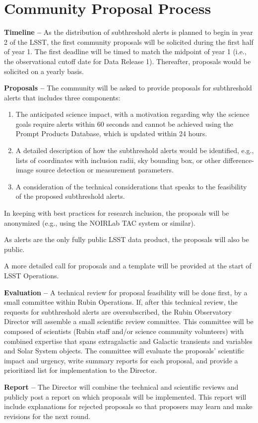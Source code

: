 \section{Community Proposal Process}\label{sec:process}

\textbf{Timeline --}
As the distribution of subthreshold alerts is planned to begin in year 2 of the LSST, the first community proposals will be solicited during the first half of year 1.
The first deadline will be timed to match the midpoint of year 1 (i.e., the observational cutoff date for Data Release 1).
Thereafter, proposals would be solicited on a yearly basis.

\textbf{Proposals --}
The community will be asked to provide proposals for subthreshold alerts that includes three components:

\begin{enumerate}
\item The anticipated science impact, with a motivation regarding why the science goals require alerts within 60 seconds and cannot be achieved using the Prompt Products Database, which is updated within 24 hours.
\item A detailed description of how the subthreshold alerts would be identified, e.g., lists of coordinates with inclusion radii, sky bounding box, or other difference-image source detection or measurement parameters.
\item A consideration of the technical considerations that speaks to the feasibility of the proposed subthreshold alerts.
\end{enumerate}

In keeping with best practices for research inclusion, the proposals will be anonymized (e.g., using the NOIRLab TAC system or similar).

As alerts are the only fully public LSST data product, the proposals will also be public.

A more detailed call for proposals and a template will be provided at the start of LSST Operations.

\textbf{Evaluation --} A technical review for proposal feasibility will be done first, by a small committee within Rubin Operations.
If, after this technical review, the requests for subthreshold alerts are oversubscribed, the Rubin Observatory Director will assemble a small scientific review committee.
This committee will be composed of scientists (Rubin staff and/or science community volunteers) with combined expertise that spans extragalactic and Galactic transients and variables and Solar System objects.
The committee will evaluate the proposals' scientific impact and urgency, write summary reports for each proposal, and provide a prioritized list for implementation to the Director.

\textbf{Report --} The Director will combine the technical and scientific reviews and publicly post a report on which proposals will be implemented.
This report will include explanations for rejected proposals so that proposers may learn and make revisions for the next round.
